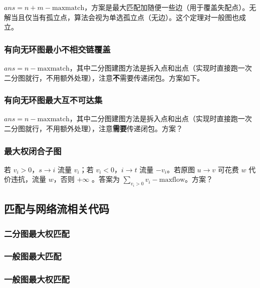 \documentclass[12pt]{ctexart}
\begin{document}
$ans=n+m-\text{maxmatch}$，方案是最大匹配加随便一些边（用于覆盖失配点）。无解当且仅当有孤立点，算法会视为单选孤立点（无边）。这个定理对一般图也成立。

\subsubsection{有向无环图最小不相交链覆盖}

$ans=n-\text{maxmatch}$，其中二分图建图方法是拆入点和出点（实现时直接跑一次二分图就行，不用额外处理），注意\textbf{不}需要传递闭包。方案如下。



\subsubsection{有向无环图最大互不可达集}

$ans=n-\text{maxmatch}$，其中二分图建图方法是拆入点和出点（实现时直接跑一次二分图就行，不用额外处理），注意\textbf{需要}传递闭包。方案？

\subsubsection{最大权闭合子图}

若 $v_i>0$，$s\to i$ 流量 $v_i$；若 $v_i<0$，$i\to t$ 流量 $-v_i$。若原图 $u\to v$ 可花费 $w$ 代价违抗，流量 $w$，否则 $+\infty$ 。答案为 $\sum\limits_{v_i>0} v_i-\text{maxflow}$。方案？

\subsection{匹配与网络流相关代码}

\subsubsection{二分图最大权匹配}



\subsubsection{一般图最大匹配}



\subsubsection{一般图最大权匹配}
\end{document}
